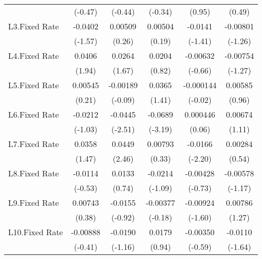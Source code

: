 {\begin{longtable}{l*{5}{c}}
                &  (-0.47)         &  (-0.44)         &  (-0.34)         &   (0.95)         &   (0.49)         \\
[1em]
L3.Fixed Rate   &  -0.0402         &  0.00509         &  0.00504         &  -0.0141         & -0.00801         \\
                &  (-1.57)         &   (0.26)         &   (0.19)         &  (-1.41)         &  (-1.26)         \\
[1em]
L4.Fixed Rate   &   0.0406         &   0.0264         &   0.0204         & -0.00632         & -0.00754         \\
                &   (1.94)         &   (1.67)         &   (0.82)         &  (-0.66)         &  (-1.27)         \\
[1em]
L5.Fixed Rate   &  0.00545         & -0.00189         &   0.0365         &-0.000144         &  0.00585         \\
                &   (0.21)         &  (-0.09)         &   (1.41)         &  (-0.02)         &   (0.96)         \\
[1em]
L6.Fixed Rate   &  -0.0212         &  -0.0445\sym{*}  &  -0.0689\sym{**} & 0.000446         &  0.00674         \\
                &  (-1.03)         &  (-2.51)         &  (-3.19)         &   (0.06)         &   (1.11)         \\
[1em]
L7.Fixed Rate   &   0.0358         &   0.0449\sym{*}  &  0.00793         &  -0.0166\sym{*}  &  0.00284         \\
                &   (1.47)         &   (2.46)         &   (0.33)         &  (-2.20)         &   (0.54)         \\
[1em]
L8.Fixed Rate   &  -0.0114         &   0.0133         &  -0.0214         & -0.00428         & -0.00578         \\
                &  (-0.53)         &   (0.74)         &  (-1.09)         &  (-0.73)         &  (-1.17)         \\
[1em]
L9.Fixed Rate   &  0.00743         &  -0.0155         & -0.00377         & -0.00924         &  0.00786         \\
                &   (0.38)         &  (-0.92)         &  (-0.18)         &  (-1.60)         &   (1.27)         \\
[1em]
L10.Fixed Rate  & -0.00888         &  -0.0190         &   0.0179         & -0.00350         &  -0.0110         \\
                &  (-0.41)         &  (-1.16)         &   (0.94)         &  (-0.59)         &  (-1.64)         \\

\end{longtable}}

